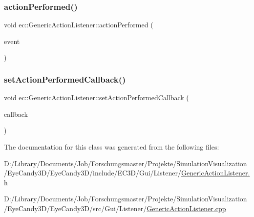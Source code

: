 \subsubsection{\texorpdfstring{action\+Performed()}{actionPerformed()}}
{\footnotesize\ttfamily void ec\+::\+Generic\+Action\+Listener\+::action\+Performed (\begin{DoxyParamCaption}\item[{const agui\+::\+Action\+Event \&}]{event }\end{DoxyParamCaption})\hspace{0.3cm}{\ttfamily [override]}}

\mbox{\label{classec_1_1_generic_action_listener_ae824ead75dce8eae0910da7432e3c400}} 
\subsubsection{\texorpdfstring{set\+Action\+Performed\+Callback()}{setActionPerformedCallback()}}
{\footnotesize\ttfamily void ec\+::\+Generic\+Action\+Listener\+::set\+Action\+Performed\+Callback (\begin{DoxyParamCaption}\item[{const \mbox{\hyperlink{classec_1_1_generic_action_listener_ab58c5e9b4caf14e4d1b1e50ffff5e628}{Action\+Performed\+\_\+\+Callback}} \&}]{callback }\end{DoxyParamCaption})}



The documentation for this class was generated from the following files\+:\begin{DoxyCompactItemize}
\item 
D\+:/\+Library/\+Documents/\+Job/\+Forschungsmaster/\+Projekte/\+Simulation\+Visualization/\+Eye\+Candy3\+D/\+Eye\+Candy3\+D/include/\+E\+C3\+D/\+Gui/\+Listener/\mbox{\hyperlink{_generic_action_listener_8h}{Generic\+Action\+Listener.\+h}}\item 
D\+:/\+Library/\+Documents/\+Job/\+Forschungsmaster/\+Projekte/\+Simulation\+Visualization/\+Eye\+Candy3\+D/\+Eye\+Candy3\+D/src/\+Gui/\+Listener/\mbox{\hyperlink{_generic_action_listener_8cpp}{Generic\+Action\+Listener.\+cpp}}\end{DoxyCompactItemize}
